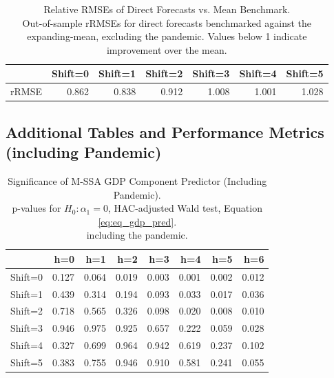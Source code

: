 \documentclass[11pt,a4paper]{article}
\begin{document}
\begin{table}[ht]
\caption{Relative RMSEs of Direct Forecasts vs. Mean Benchmark.\\
Out-of-sample rRMSEs for direct forecasts benchmarked against the expanding-mean, excluding the pandemic. Values below 1 indicate improvement over the mean.
\label{tab:rRMSE_mSSA_direct_mean_without_covid8}}
\centering
\begin{tabular}{rrrrrrr}
  \hline
 & Shift=0 & Shift=1 & Shift=2 & Shift=3 & Shift=4 & Shift=5 \\ 
  \hline
rRMSE & 0.862 & 0.838 & 0.912 & 1.008 & 1.001 & 1.028 \\  
   \hline
\end{tabular}
\end{table}



\newpage
\subsection{Additional Tables and Performance Metrics (including Pandemic)}

\begin{table}[ht]
\caption{Significance of M-SSA GDP Component Predictor (Including Pandemic).\\
p-values for $H_0: {\alpha_1} = 0$, HAC-adjusted Wald test, Equation \eqref{eq:eq_gdp_pred}.\\ including the pandemic.} 
\label{tab:p_val1}
\centering
\begin{tabular}{rrrrrrrr}
  \hline
 & h=0 & h=1 & h=2 & h=3 & h=4 & h=5 & h=6 \\ 
  \hline
Shift=0 & 0.127 & 0.064 & 0.019 & 0.003 & 0.001 & 0.002 & 0.012 \\ 
  Shift=1 & 0.439 & 0.314 & 0.194 & 0.093 & 0.033 & 0.017 & 0.036 \\ 
  Shift=2 & 0.718 & 0.565 & 0.326 & 0.098 & 0.020 & 0.008 & 0.010 \\ 
  Shift=3 & 0.946 & 0.975 & 0.925 & 0.657 & 0.222 & 0.059 & 0.028 \\ 
  Shift=4 & 0.327 & 0.699 & 0.964 & 0.942 & 0.619 & 0.237 & 0.102 \\ 
  Shift=5 & 0.383 & 0.755 & 0.946 & 0.910 & 0.581 & 0.241 & 0.055 \\ 
   \hline
\end{tabular}
\end{table}
\end{document}
